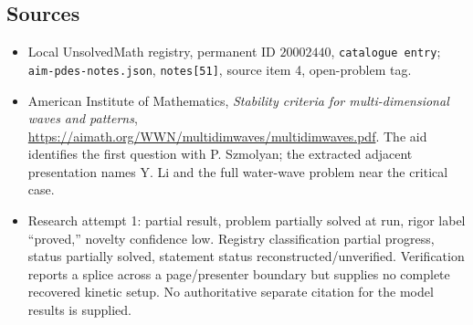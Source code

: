 \documentclass[11pt]{article}
\begin{document}
\subsection{Sources}
\begin{itemize}
\item Local UnsolvedMath registry, permanent ID $20002440$, \texttt{catalogue entry}; \texttt{aim-pdes-notes.json}, \texttt{notes[51]}, source item 4, open-problem tag.
\item American Institute of Mathematics, \emph{Stability criteria for multi-dimensional waves and patterns}, \url{https://aimath.org/WWN/multidimwaves/multidimwaves.pdf}. The aid identifies the first question with P. Szmolyan; the extracted adjacent presentation names Y. Li and the full water-wave problem near the critical case.
\item Research attempt 1: partial result, problem partially solved at run, rigor label ``proved,'' novelty confidence low. Registry classification partial progress, status partially solved, statement status reconstructed/unverified. Verification reports a splice across a page/presenter boundary but supplies no complete recovered kinetic setup. No authoritative separate citation for the model results is supplied.
\end{itemize}
\end{document}
